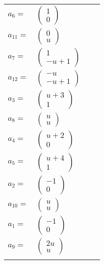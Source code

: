 \documentclass[1p]{elsarticle_modified}
\theoremstyle{definition}
\begin{document}
\begin{tabular}{m{7pt} m{180pt} m{7pt} m{180pt} }
\flushright $a_{6}=$&$\begin{pmatrix}1\\0\end{pmatrix}$ \\
\flushright $a_{11}=$&$\begin{pmatrix}0\\u\end{pmatrix}$ \\
\flushright $a_{7}=$&$\begin{pmatrix}1\\- u+1\end{pmatrix}$ \\
\flushright $a_{12}=$&$\begin{pmatrix}- u\\- u+1\end{pmatrix}$ \\
\flushright $a_{3}=$&$\begin{pmatrix}u+3\\1\end{pmatrix}$ \\
\flushright $a_{8}=$&$\begin{pmatrix}u\\u\end{pmatrix}$ \\
\flushright $a_{4}=$&$\begin{pmatrix}u+2\\0\end{pmatrix}$ \\
\flushright $a_{5}=$&$\begin{pmatrix}u+4\\1\end{pmatrix}$ \\
\flushright $a_{2}=$&$\begin{pmatrix}-1\\0\end{pmatrix}$ \\
\flushright $a_{10}=$&$\begin{pmatrix}u\\u\end{pmatrix}$ \\
\flushright $a_{1}=$&$\begin{pmatrix}-1\\0\end{pmatrix}$ \\
\flushright $a_{9}=$&$\begin{pmatrix}2 u\\u\end{pmatrix}$\\&\end{tabular}
\end{document}
